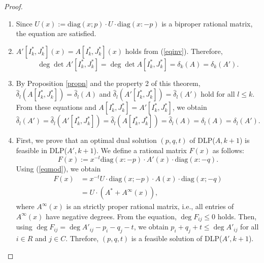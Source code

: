 \begin{proof}
\hspace{1zw}
\begin{enumerate}
\item Since $ U(x) := \mathrm{diag} (x;p) \cdot U \cdot \mathrm{diag} (x:-p) $ is a biproper rational matrix, 
the equation are satisfied.
\item $ A'[I^{\ast}_k,J^{\ast}_k] (x) = A[I^{\ast}_k,J^{\ast}_k] (x) $ holds from (\ref{eqinv}). Therefore,
\begin{equation*}
\deg \det A'[I^{\ast}_k,J^{\ast}_k] = \deg \det A[I^{\ast}_k , J^{\ast}_k]
= \delta_k (A)
= \delta_k (A').
\end{equation*}
\item By Proposition \ref{propn} and the property 2 of this theorem, 
$ \hat{\delta}_l ( A[I^{\ast}_k,J^{\ast}_k]) = \hat{\delta}_l (A) $ 
and $ \hat{\delta}_l ( A'[I^{\ast}_k,J^{\ast}_k]) = \hat{\delta}_l (A')$ hold for all $ l \le k $. 
From these equations and $ A[I^{\ast}_k,J^{\ast}_k] = A'[I^{\ast}_k,J^{\ast}_k] $, 
we obtain
\begin{equation*}
\hat{\delta}_l (A') = \hat{\delta}_l ( A'[I^{\ast}_k,J^{\ast}_k]) = \hat{\delta}_l (A[I^{\ast}_k,J^{\ast}_k]) 
= \hat{\delta}_l (A) = \delta_l (A) = \delta_l (A').
\end{equation*}
\item 
First, we prove that an optimal dual solution $ (p,q,t) $ of DLP($A,k+1$) 
is feasible in DLP($A',k+1$). 
We define a rational matrix $F(x)$ as follows:
\[ F(x) := x^{-t} \mathrm{diag} (x:-p) \cdot A'(x) \cdot \mathrm{diag} (x:-q). \]
Using (\ref{eqmod}), we obtain
\begin{align*}
F(x) &= x^{-t} U \cdot \mathrm{diag} (x;-p) \cdot A(x) \cdot \mathrm{diag} (x;-q) \\
&= U \cdot ( A^{\ast} + A^{\infty} (x) ),
\end{align*}
where $ A^{\infty} (x) $ is an strictly proper rational matrix, 
i.e., all entries of $ A^{\infty} (x) $ have negative degrees. 
From the equation, $ \deg F_{ij} \le 0 $ holds. 
Then, using $ \deg F_{ij} = \deg A'_{ij} - p_i - q_j - t $, 
we obtain $ p_i + q_j + t \le \deg A'_{ij} $ for all $ i \in R $ and $ j \in C $. 
Threfore, $ (p,q,t) $ is a feasible solution of DLP($A',k+1$).


\end{enumerate}
\end{proof}
